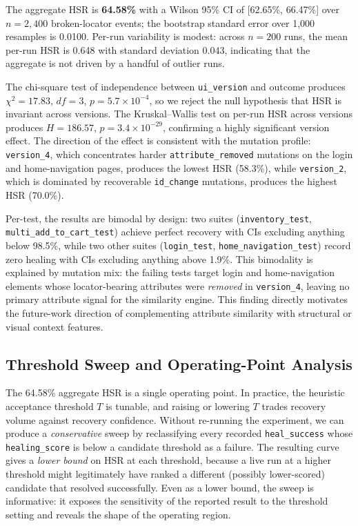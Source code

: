 \documentclass[conference]{IEEEtran}
\begin{document}
The aggregate HSR is \textbf{64.58\%} with a Wilson 95\% CI of [62.65\%, 66.47\%] over $n=2{,}400$ broken-locator events; the bootstrap standard error over 1{,}000 resamples is 0.0100. Per-run variability is modest: across $n=200$ runs, the mean per-run HSR is 0.648 with standard deviation 0.043, indicating that the aggregate is not driven by a handful of outlier runs.

The chi-square test of independence between \texttt{ui\_version} and outcome produces $\chi^2 = 17.83$, $\mathit{df} = 3$, $p = 5.7 \times 10^{-4}$, so we reject the null hypothesis that HSR is invariant across versions. The Kruskal--Wallis test on per-run HSR across versions produces $H = 186.57$, $p = 3.4 \times 10^{-29}$, confirming a highly significant version effect. The direction of the effect is consistent with the mutation profile: \texttt{version\_4}, which concentrates harder \texttt{attribute\_removed} mutations on the login and home-navigation pages, produces the lowest HSR (58.3\%), while \texttt{version\_2}, which is dominated by recoverable \texttt{id\_change} mutations, produces the highest HSR (70.0\%).

Per-test, the results are bimodal by design: two suites (\texttt{inventory\_test}, \texttt{multi\_add\_to\_cart\_test}) achieve perfect recovery with CIs excluding anything below 98.5\%, while two other suites (\texttt{login\_test}, \texttt{home\_navigation\_test}) record zero healing with CIs excluding anything above 1.9\%. This bimodality is explained by mutation mix: the failing tests target login and home-navigation elements whose locator-bearing attributes were \emph{removed} in \texttt{version\_4}, leaving no primary attribute signal for the similarity engine. This finding directly motivates the future-work direction of complementing attribute similarity with structural or visual context features.

\subsection{Threshold Sweep and Operating-Point Analysis}
\label{sec:threshold}
The 64.58\% aggregate HSR is a single operating point. In practice, the heuristic acceptance threshold $T$ is tunable, and raising or lowering $T$ trades recovery volume against recovery confidence. Without re-running the experiment, we can produce a \emph{conservative} sweep by reclassifying every recorded \texttt{heal\_success} whose \texttt{healing\_score} is below a candidate threshold as a failure. The resulting curve gives a \emph{lower bound} on HSR at each threshold, because a live run at a higher threshold might legitimately have ranked a different (possibly lower-scored) candidate that resolved successfully. Even as a lower bound, the sweep is informative: it exposes the sensitivity of the reported result to the threshold setting and reveals the shape of the operating region.
\end{document}
